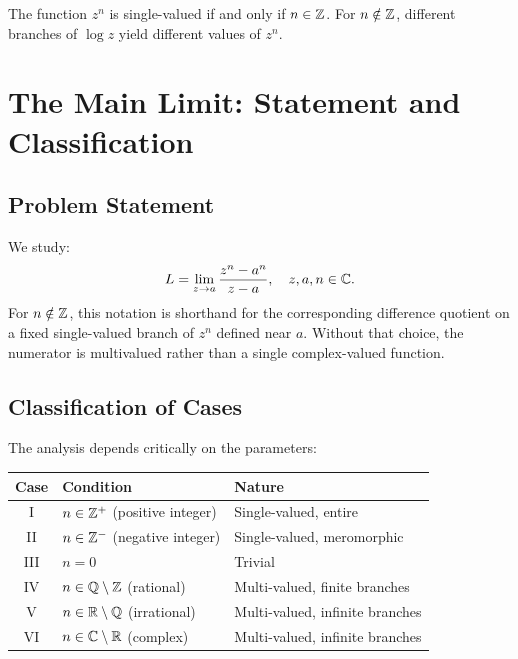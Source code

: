 \begin{remark}
The function $z^n$ is single-valued if and only if $n \in \mathbb{Z}$. For $n \notin \mathbb{Z}$, different branches of $\log z$ yield different values of $z^n$.
\end{remark}

\section{The Main Limit: Statement and Classification}

\subsection{Problem Statement}

We study:
\begin{equation}
L = \lim_{z \to a} \frac{z^n - a^n}{z - a}, \quad z, a, n \in \mathbb{C}.
\label{eq:main_limit}
\end{equation}
For $n \notin \mathbb{Z}$, this notation is shorthand for the corresponding difference
quotient on a fixed single-valued branch of $z^n$ defined near $a$. Without that
choice, the numerator is multivalued rather than a single complex-valued
function.

\subsection{Classification of Cases}

The analysis depends critically on the parameters:

\begin{center}
\renewcommand{\arraystretch}{1.4}
\begin{tabular}{|c|l|l|}
\hline
\textbf{Case} & \textbf{Condition} & \textbf{Nature} \\
\hline
I & $n \in \mathbb{Z}^+$ (positive integer) & Single-valued, entire \\
II & $n \in \mathbb{Z}^-$ (negative integer) & Single-valued, meromorphic \\
III & $n = 0$ & Trivial \\
IV & $n \in \mathbb{Q} \setminus \mathbb{Z}$ (rational) & Multi-valued, finite branches \\
V & $n \in \mathbb{R} \setminus \mathbb{Q}$ (irrational) & Multi-valued, infinite branches \\
VI & $n \in \mathbb{C} \setminus \mathbb{R}$ (complex) & Multi-valued, infinite branches \\
\hline
\end{tabular}
\end{center}

